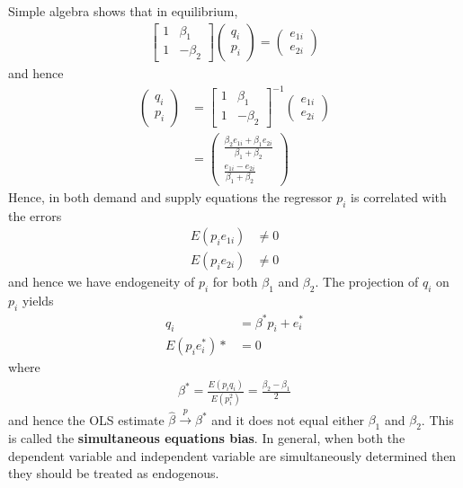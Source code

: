 \documentclass[11pt]{article} %
\theoremstyle{definition}
\numberwithin{defn}{subsection}
\numberwithin{thm}{subsection}
\numberwithin{ex}{subsection}
\newcommand{\plim}{\overset{p}{\rightarrow}}
\newcommand{\bhat}{\hat{\beta}}
\begin{document}
Simple algebra shows that in equilibrium,
\begin{align*}
\begin{bmatrix}1&\beta_1\\1 &-\beta_2\end{bmatrix}\begin{pmatrix}q_i\\p_i\end{pmatrix}=\begin{pmatrix}e_{1i}\\e_{2i}\end{pmatrix}
\end{align*}
and hence
\begin{align*}
\begin{pmatrix}q_i\\p_i\end{pmatrix}&=\begin{bmatrix}1&\beta_1\\1 &-\beta_2\end{bmatrix}^{-1}\begin{pmatrix}e_{1i}\\e_{2i}\end{pmatrix}\\
&=\begin{pmatrix}
\frac{\beta_2 e_{1i}+\beta_1 e_{2i}}{\beta_1+\beta_2}\\
\frac{e_{1i}-e_{2i}}{\beta_1+\beta_2}
\end{pmatrix}
\end{align*}
Hence, in both demand and supply equations the regressor $p_i$ is correlated with the errors
\begin{align*}
E(p_ie_{1i})&\neq0\\
E(p_ie_{2i})&\neq0
\end{align*}
and hence we have endogeneity of $p_i$ for both $\beta_1$ and $\beta_2$. 
The projection of $q_i$ on $p_i$ yields
\begin{align*}
q_i&=\beta^* p_i+e_i^*\\
E(p_ie_i^*)*&=0
\end{align*}
where
\begin{align*}
\beta^*=\frac{E(p_iq_i)}{E(p_i^2)}=\frac{\beta_2-\beta_1}{2}
\end{align*}
and hence the OLS estimate $\bhat\plim \beta^*$ and it does not equal either $\beta_1$ and $\beta_2$. This is called the \textbf{simultaneous equations bias}. In general, when both the dependent variable and independent variable are simultaneously determined then they should be treated as endogenous.
\end{document}
